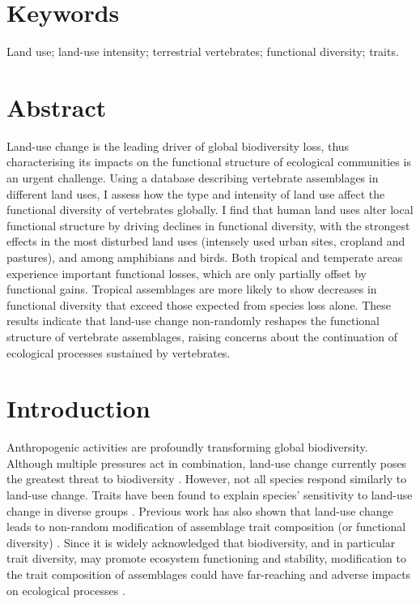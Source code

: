 
\section*{Keywords}
Land use; land-use intensity; terrestrial vertebrates; functional diversity; traits.

\section*{Abstract}
Land-use change is the leading driver of global biodiversity loss, thus characterising its impacts on the functional structure of ecological communities is an urgent challenge. Using a database describing vertebrate assemblages in different land uses, I assess how the type and intensity of land use affect the functional diversity of vertebrates globally. I find that human land uses alter local functional structure by driving declines in functional diversity, with the strongest effects in the most disturbed land uses (intensely used urban sites, cropland and pastures), and among amphibians and birds. Both tropical and temperate areas experience important functional losses, which are only partially offset by functional gains. Tropical assemblages are more likely to show decreases in functional diversity that exceed those expected from species loss alone. These results indicate that land-use change non-randomly reshapes the functional structure of vertebrate assemblages, raising concerns about the continuation of ecological processes sustained by vertebrates.

\section{Introduction}
Anthropogenic activities are profoundly transforming global biodiversity. Although multiple pressures act in combination, land-use change currently poses the greatest threat to biodiversity \citep{Maxwell2016, Newbold2015}. However, not all species respond similarly to land-use change. Traits have been found to explain species' sensitivity to land-use change in diverse groups \citep{Newbold2013, Nowakowski2017, Quesnelle2014, Todd2017}. Previous work has also shown that land-use change leads to non-random modification of assemblage trait composition (or functional diversity) \citep{Chapman2018, Colin2018, Flynn2009, LaSorte2018, Newbold2013, Tinoco2018}. Since it is widely acknowledged that biodiversity, and in particular trait diversity, may promote ecosystem functioning and stability, modification to the trait composition of assemblages could have far-reaching and adverse impacts on ecological processes \citep{Hooper2012, Magioli2021, Oliver2015, Tilman1994}.

